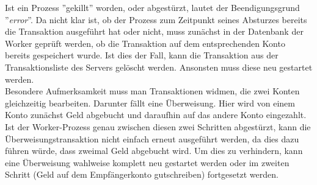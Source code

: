 Ist ein Prozess ''gekillt'' worden, oder abgestürzt, lautet der Beendigungsgrund ''\textit{error}''. Da nicht klar ist, ob der Prozess zum Zeitpunkt seines Absturzes bereits die Transaktion ausgeführt hat oder nicht, muss zunächst in der Datenbank der Worker geprüft werden, ob die Transaktion auf dem entsprechenden Konto bereits gespeichert wurde. Ist dies der Fall, kann die Transaktion aus der Transaktionsliste des Servers gelöscht werden. Ansonsten muss diese neu gestartet werden.\\
Besondere Aufmerksamkeit muss man Transaktionen widmen, die zwei Konten gleichzeitig bearbeiten. Darunter fällt eine Überweisung. Hier wird von einem Konto zunächst Geld abgebucht und daraufhin auf das andere Konto eingezahlt. Ist der Worker-Prozess genau zwischen diesen zwei Schritten abgestürzt, kann die Überweisungstransaktion nicht einfach erneut ausgeführt werden, da dies dazu führen würde, dass zweimal Geld abgebucht wird. Um dies zu verhindern, kann eine Überweisung wahlweise komplett neu gestartet werden oder im zweiten Schritt (Geld auf dem Empfängerkonto gutschreiben) fortgesetzt werden.